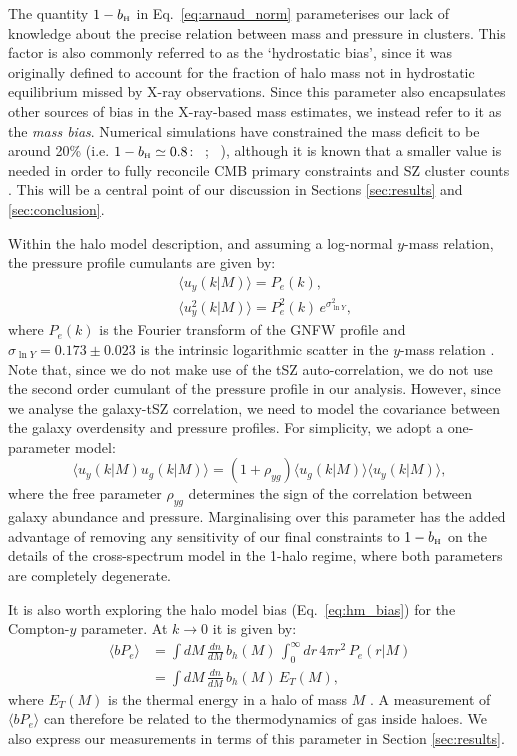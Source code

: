 \documentclass[useAMS,usenatbib]{mn2e}
\def\bH{b_{\scriptscriptstyle\rm H}}
\def\citejap#1{\citeauthor{#1}\ \citeyear{#1}}
\begin{document}
      The quantity $1-\bH$ in Eq.\!~\ref{eq:arnaud_norm} parameterises our lack of knowledge about the precise relation between mass and pressure in clusters. This factor is also commonly referred to as the `hydrostatic bias', since it was originally defined to account for the fraction of halo mass not in hydrostatic equilibrium missed by X-ray observations. Since this parameter also encapsulates other sources of bias in the X-ray-based mass estimates, we instead refer to it as the {\sl mass bias}. Numerical simulations have constrained the mass deficit to be around 20\% (i.e. $1-\bH\simeq0.8$: \citejap{2012ApJ...758...74B}; \citejap{2014ApJ...782..107N}), although it is known that a smaller value is needed in order to fully reconcile CMB primary constraints and SZ cluster counts \citep{2016A&A...594A..24P}. This will be a central point of our discussion in Sections \ref{sec:results} and \ref{sec:conclusion}.

      Within the halo model description, and assuming a log-normal $y$-mass relation, the pressure profile cumulants are given by:
      \begin{align}
        &\langle u_y(k|M)\rangle=P_e(k),\\
        &\langle u_y^2(k|M)\rangle=P_e^2(k)\,e^{\sigma_{\ln Y}^2},
      \end{align}
      where $P_e(k)$ is the Fourier transform of the GNFW profile and $\sigma_{\ln Y}=0.173\pm0.023$ is the intrinsic logarithmic scatter in the $y$-mass relation \cite{2016A&A...594A..24P}. Note that, since we do not make use of the tSZ auto-correlation, we do not use the second order cumulant of the pressure profile in our analysis. However, since we analyse the galaxy-tSZ correlation, we need to model the covariance between the galaxy overdensity and pressure profiles. For simplicity, we adopt a one-parameter model:
      \begin{equation}
        \langle u_y(k|M) u_g(k|M)\rangle = (1+\rho_{yg})\langle u_g(k|M)\rangle \langle u_y(k|M)\rangle,
      \end{equation}
      where the free parameter $\rho_{yg}$ determines the sign of the correlation between galaxy abundance and pressure. Marginalising over this parameter has the added advantage of removing any sensitivity of our final constraints to $1-\bH$ on the details of the cross-spectrum model in the 1-halo regime, where both parameters are completely degenerate.

      It is also worth exploring the halo model bias (Eq.\!~\ref{eq:hm_bias}) for the Compton-$y$ parameter. At $k\rightarrow0$ it is given by:
      \begin{align}\nonumber
        \langle bP_e\rangle&=\int dM\,\frac{dn}{dM}\,b_h(M)\,\int_0^\infty dr\,4\pi r^2\,P_e(r|M)\\\label{eq:by}
               &=\int dM\,\frac{dn}{dM}\,b_h(M)\,E_T(M),
      \end{align}
      where $E_T(M)$ is the thermal energy in a halo of mass $M$ \citep{2017MNRAS.467.2315V,2019arXiv190413347P}. A measurement of $\langle bP_e\rangle$ can therefore be related to the thermodynamics of gas inside haloes. We also express our measurements in terms of this parameter in Section \ref{sec:results}.
      
\end{document}

